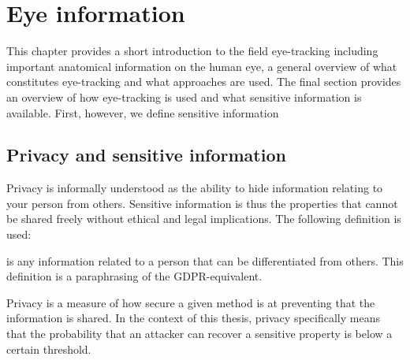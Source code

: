 \chapter{Eye information}
This chapter provides a short introduction to the field eye-tracking including important anatomical information on the human eye, a general overview of what constitutes eye-tracking and what approaches are used. The final section provides an overview of how eye-tracking is used and what sensitive information is available. First, however, we define sensitive information

\section{Privacy and sensitive information}
Privacy is informally understood as the ability to hide information relating to your person from others. Sensitive information is thus the properties that cannot be shared freely without ethical and legal implications. The following definition is used:
\begin{definition} 
	is any information related to a person that can be differentiated from others. This definition is a paraphrasing of the GDPR-equivalent.
\end{definition}

Privacy is a measure of how secure a given method is at preventing that the information is shared. In the context of this thesis, privacy specifically means that the probability that an attacker can recover a sensitive property is below a certain threshold.










 
 






